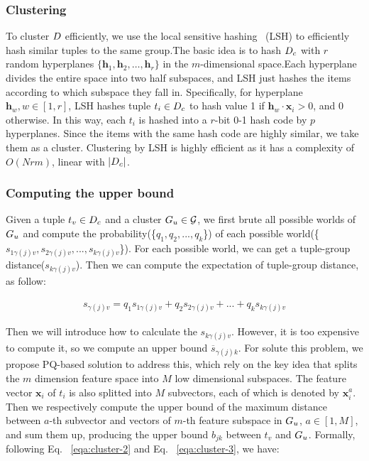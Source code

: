 \subsubsection{Clustering}
\label{subsec:clustering}
To cluster $D$ efficiently,  we use the local sensitive hashing~\cite{} (LSH) to efficiently hash similar tuples to the same group.The basic idea  is to hash $D_c$ with $r$ random hyperplanes $\{\mathbf{h}_1, \mathbf{h}_2, \dots, \mathbf{h}_r\}$ in the  $m$-dimensional space.Each hyperplane divides the entire space into two half subspaces, and LSH just hashes the  items according to which subspace they fall in. Specifically, for  hyperplane $\mathbf{h}_w, w\in[1,r]$, LSH hashes tuple $t_i\in D_c$ to hash value 1 if $\mathbf{h}_w \cdot \mathbf{x}_i> 0$, and 0 otherwise.
In this way, each $t_i$ is hashed into a $r$-bit 0-1 hash code by $p$ hyperplanes.
Since the items with the same hash code are highly similar, we take them as a cluster.
Clustering by LSH is highly efficient as it has a complexity of  $O(Nrm)$, linear with $|D_c|$. 

\subsubsection{Computing the upper bound}

Given a tuple $t_v\in D_c$ and a cluster $G_u \in \mathcal{G}$, we first brute all possible worlds of $G_u$ and compute the probability(\ie \{$q_1, q_2, ..., q_k$\}) of each possible world(\ie \{$s_{1\gamma(j)v},s_{2\gamma(j)v}, ..., s_{k\gamma(j)v}$\}). For each possible world, we can get a tuple-group distance(\ie $s_{k\gamma{(j)}v}$). Then we can compute the expectation of tuple-group distance, as follow:

\begin{equation}\label{eqa:cluster-4}
    \begin{aligned}
        s_{\gamma(j)v} = q_1s_{1\gamma(j)v} + q_2s_{2\gamma(j)v} + ... + q_ks_{k\gamma(j)v} 
    \end{aligned}
\end{equation}


Then we will introduce how to calculate the  $s_{k\gamma(j)v}$. However, it is too expensive to compute it, so we compute an upper bound $\overline{s}_{\gamma(j)k}$. 
For solute this problem, we propose PQ-based solution to address this, which rely on the key idea that splits the $m$ dimension feature space into $M$ low dimensional subspaces. The feature vector $\mathbf{x}_i$ of  $t_i$ is also splitted into $M$ subvectors, each of which is denoted by $\mathbf{x}^a_i$. 
Then we respectively compute the upper bound of the maximum distance between $a$-th subvector and vectors of $m$-th feature subspace in $G_u$, $a\in [1,M]$, and sum them up, producing the upper bound $b_{jk}$ between $t_v$ and $G_u$. Formally, following Eq. ~\ref{eqa:cluster-2} and Eq. ~\ref{eqa:cluster-3}, we have:

